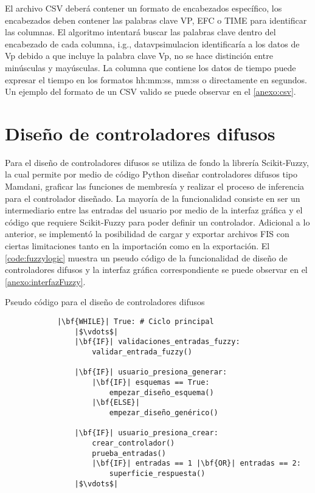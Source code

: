         El archivo CSV deberá contener un formato de encabezados específico, los encabezados deben contener las palabras clave VP, EFC o TIME para identificar las columnas. El algoritmo intentará buscar las palabras clave dentro del encabezado de cada columna, i.g., datavpsimulacion identificaría a los datos de Vp debido a que incluye la palabra clave Vp, no se hace distinción entre minúsculas y mayúsculas. La columna que contiene los datos de tiempo puede expresar el tiempo en los formatos hh:mm:ss, mm:ss o directamente en segundos. Un ejemplo del formato de un CSV valido se puede observar en el \ref{anexo:csv}.

\section{Diseño de controladores difusos}
    
    Para el diseño de controladores difusos se utiliza de fondo la librería Scikit-Fuzzy, la cual permite por medio de código Python diseñar controladores difusos tipo Mamdani, graficar las funciones de membresía y realizar el proceso de inferencia para el controlador diseñado. La mayoría de la funcionalidad consiste en ser un intermediario entre las entradas del usuario por medio de la interfaz gráfica y el código que requiere Scikit-Fuzzy para poder definir un controlador. Adicional a lo anterior, se implementó la posibilidad de cargar y exportar archivos FIS con ciertas limitaciones tanto en la importación como en la exportación. El \cref{code:fuzzylogic} muestra un pseudo código de la funcionalidad de diseño de controladores difusos y la interfaz gráfica correspondiente se puede observar en el \ref{anexo:interfazFuzzy}.    

    \begin{longlisting}
        \caption[Pseudo código - Diseño de controladores difusos]{Pseudo código para el diseño de controladores difusos}
        \label{code:fuzzylogic}				
        \begin{verbatim}
            |\bf{WHILE}| True: # Ciclo principal
                |$\vdots$|
                |\bf{IF}| validaciones_entradas_fuzzy:
                    validar_entrada_fuzzy()
                
                |\bf{IF}| usuario_presiona_generar:
                    |\bf{IF}| esquemas == True:
                        empezar_diseño_esquema()
                    |\bf{ELSE}|
                        empezar_diseño_genérico()
                
                |\bf{IF}| usuario_presiona_crear:
                    crear_controlador()
                    prueba_entradas()
                    |\bf{IF}| entradas == 1 |\bf{OR}| entradas == 2:
                        superficie_respuesta()
                |$\vdots$|
        \end{verbatim}
    \end{longlisting}
    
